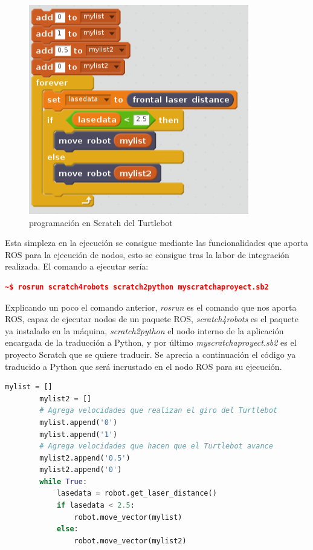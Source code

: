 \begin{figure}[H]
    \centering
    \includegraphics[scale=0.60]{img/robot-obstaculos-scratch.PNG}
  	\caption{programación en Scratch del Turtlebot}
  	\label{fig:turtlebot}
\end{figure}
Esta simpleza en la ejecución se consigue mediante las funcionalidades que aporta ROS para la ejecución de nodos, esto se consigue tras la labor de integración realizada. El comando a ejecutar sería:

\begin{lstlisting}[language=json,firstnumber=1]
~$ rosrun scratch4robots scratch2python myscratchaproyect.sb2
\end{lstlisting}


Explicando un poco el comando anterior, \textit{rosrun} es el comando que nos aporta ROS, capaz de ejecutar nodos de un paquete ROS, \textit{scratch4robots} es el paquete ya instalado en la máquina, \textit{scratch2python} el nodo interno de la aplicación encargada de la traducción a Python, y por último \textit{myscratchaproyect.sb2} es el proyecto Scratch que se quiere traducir. Se aprecia a continuación el código ya traducido a Python que será incrustado en el nodo ROS para su ejecución.

\begin{lstlisting}[language=python,firstnumber=1]
        mylist = []
        mylist2 = []
		# Agrega velocidades que realizan el giro del Turtlebot
        mylist.append('0')
        mylist.append('1')
        # Agrega velocidades que hacen que el Turtlebot avance
        mylist2.append('0.5')
        mylist2.append('0')
        while True:
            lasedata = robot.get_laser_distance()
            if lasedata < 2.5:
                robot.move_vector(mylist)
            else:
                robot.move_vector(mylist2)
                
\end{lstlisting}

